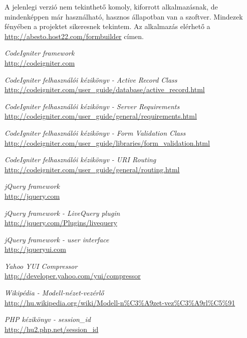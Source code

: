 \documentclass[12pt,a4paper,twoside]{article}
\begin{document}
A jelenlegi verzió nem tekinthető komoly, kiforrott alkalmazásnak, de
mindenképpen már használható, hasznos állapotban van a szoftver. Mindezek
fényében a projektet sikeresnek tekintem. Az alkalmazás elérhető a
\url{http://abesto.host22.com/formbuilder} címen.

\clearpage
{}
{}
\begin{thebibliography}{99}

  \emph{CodeIgniter framework}\\
  \url{http://codeigniter.com}

  \emph{CodeIgniter felhasználói kézikönyv - Active Record Class}\\
  \url{http://codeigniter.com/user_guide/database/active_record.html}

  \emph{CodeIgniter felhasználói kézikönyv - Server Requirements}\\
  \url{http://codeigniter.com/user_guide/general/requirements.html}

  \emph{CodeIgniter felhasználói kézikönyv - Form Validation Class}\\
  \url{http://codeigniter.com/user_guide/libraries/form_validation.html}

  \emph{CodeIgniter felhasználói kézikönyv - URI Routing}\\
  \url{http://codeigniter.com/user_guide/general/routing.html}

  \emph{jQuery framework}\\
  \url{http://jquery.com}

  \emph{jQuery framework - LiveQuery plugin}\\
  \url{http://jquery.com/Plugins/livequery}

  \emph{jQuery framework - user interface}\\
  \url{http://jqueryui.com}

  \emph{Yahoo YUI Compressor}\\
  \url{http://developer.yahoo.com/yui/compressor}

  \emph{Wikipédia - Modell-nézet-vezérlő}\\
  \url{http://hu.wikipedia.org/wiki/Modell-n\%C3\%A9zet-vez\%C3\%A9rl\%C5\%91}

  \emph{PHP kézikönyv - session\_id}\\
  \url{http://hu2.php.net/session_id}


\end{thebibliography}
\end{document}
